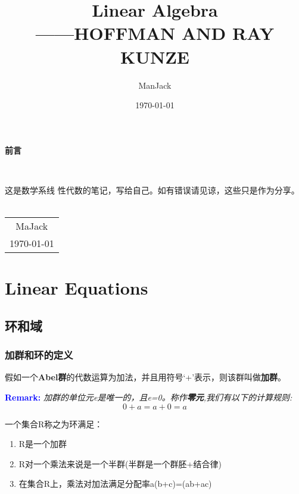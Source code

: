 \documentclass[11pt, a4paper, oneside,UTF8]{ctexbook}
\title{{\Huge{\textbf{Linear Algebra}}}\\------HOFFMAN AND RAY KUNZE}
\author{ManJack}
\date{\today}
\newenvironment{remark}
{\par\textcolor{blue}{\bfseries Remark:}\itshape}
{\par}
\newtheorem[M]{theorem}{Theorem}[section]
\newtheorem[M]{lemma}[theorem]{Lemma}
\newtheorem[M]{proposition}[theorem]{Proposition}
\newtheorem[M]{corollary}[theorem]{Corollary}
\newtheorem[M]{definition}{Definition}[section]
\begin{document}
\maketitle

\setcounter{page}{1}
\newpage
\begin{center}
	\Huge\textbf{前言}
\end{center}~\

这是数学系线      性代数的笔记，写给自己。如有错误请见谅，这些只是作为分享。
~
\begin{flushright}
	\begin{tabular}{c}
		MaJack \\
		\today
	\end{tabular}
\end{flushright}

\newpage
{}
\setcounter{page}{1}

\tableofcontents
\newpage
\setcounter{page}{1}
\chapter{Linear Equations}
\section{环和域}
\subsection{加群和环的定义}
\begin{definition}[\textbf{加群}]
	假如一个\textbf{Abel群}的代数运算为加法，并且用符号‘+’表示，则该群叫做\textbf{加群}。

\end{definition}

\begin{remark}
	加群的单位元e是唯一的，且e=0。称作\textbf{零元},我们有以下的计算规则:
	\[
		0+a=a+0=a
	\]
\end{remark}

\begin{definition}[\textbf{环}]
	一个集合R称之为环满足：
	\begin{enumerate}
		\item R是一个加群
		\item R对一个乘法来说是一个半群(半群是一个群胚+结合律)
		\item 在集合R上，乘法对加法满足分配率a(b+c)=(ab+ac)
	\end{enumerate}
\end{definition}
\end{document}
